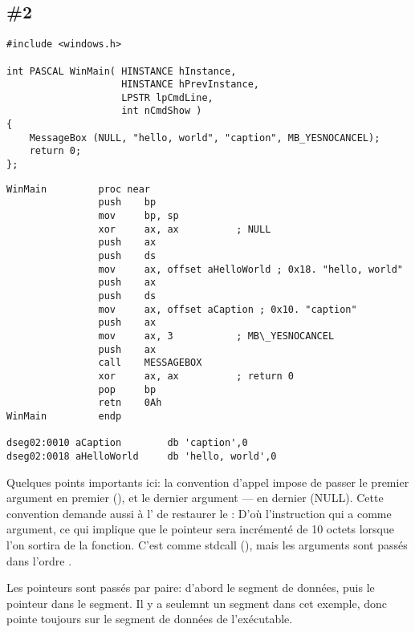 \subsection{\Example{} \#2}
\label{win16_messagebox}

\begin{lstlisting}[style=customc]
#include <windows.h>

int PASCAL WinMain( HINSTANCE hInstance,
                    HINSTANCE hPrevInstance,
                    LPSTR lpCmdLine,
                    int nCmdShow )
{
	MessageBox (NULL, "hello, world", "caption", MB_YESNOCANCEL);
	return 0;
};
\end{lstlisting}

\begin{lstlisting}[style=customasmx86]
WinMain         proc near
                push    bp
                mov     bp, sp
                xor     ax, ax          ; NULL
                push    ax
                push    ds
                mov     ax, offset aHelloWorld ; 0x18. "hello, world"
                push    ax
                push    ds
                mov     ax, offset aCaption ; 0x10. "caption"
                push    ax
                mov     ax, 3           ; MB\_YESNOCANCEL
                push    ax
                call    MESSAGEBOX
                xor     ax, ax          ; return 0
                pop     bp
                retn    0Ah
WinMain         endp

dseg02:0010 aCaption        db 'caption',0
dseg02:0018 aHelloWorld     db 'hello, world',0
\end{lstlisting}

Quelques points importants ici: la convention d'appel  impose de passer
le premier argument en premier (), et le dernier argument --- en dernier (NULL).
Cette convention demande aussi à l' de restaurer le :
D'où l'instruction  qui a  comme argument, ce qui implique que le
pointeur sera incrémenté de 10 octets lorsque l'on sortira de la fonction.
C'est comme stdcall (), mais les arguments sont passés dans l'ordre
.

Les pointeurs sont passés par paire: d'abord le segment de données, puis le pointeur
dans le segment.
Il y a seulemnt un segment dans cet exemple, donc  pointe toujours sur le segment
de données de l'exécutable.
